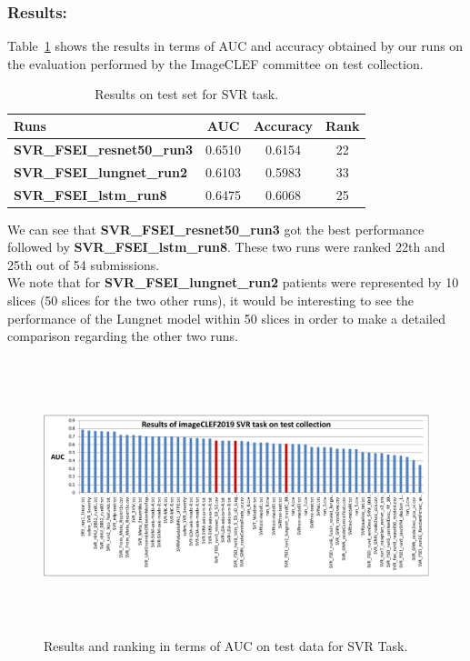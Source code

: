 \documentclass{llncs}
\begin{document}
\subsubsection{Results:}

Table~\ref{tab:resultstestsvr} shows the results in terms of AUC and accuracy obtained by our runs on the evaluation performed by the ImageCLEF committee on test collection.

\begin{table}
\center
\caption{Results on test set for SVR task.}
\label{tab:resultstestsvr}
\begin{tabular}{|l||c||c||c|}
\hline
Runs						&	AUC		& 	Accuracy	&	Rank		\\
\hline
 \textbf{SVR\_FSEI\_resnet50\_run3}			&	0.6510		&	0.6154		&	22		\\
 \textbf{SVR\_FSEI\_lungnet\_run2}			&	0.6103		&	0.5983		&	33		\\
 \textbf{SVR\_FSEI\_lstm\_run8}				&	0.6475		&	0.6068		&	25		\\
\hline
\end{tabular}
\end{table}

We can see that \textbf{SVR\_FSEI\_resnet50\_run3} got the best performance followed by  \textbf{SVR\_FSEI\_lstm\_run8}. These two runs were ranked 22th and 25th out of 54 submissions.\\

We note that for \textbf{SVR\_FSEI\_lungnet\_run2} patients were represented by 10 slices (50 slices for the two other runs), it would be interesting to see the performance of the Lungnet model within 50 slices in order to make a detailed comparison regarding the other two runs.



\begin{figure}[!ht]
\includegraphics[width=12cm,height=8cm]{results_svr_test_auc.pdf}
\caption{Results and ranking in terms of AUC on test data for SVR Task.} 
\label{fig:svrresultstestauc}
\end{figure}
\end{document}
